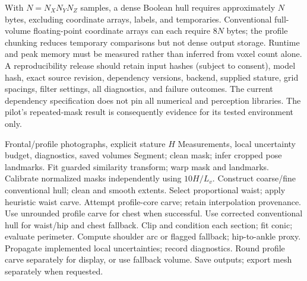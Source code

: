 \documentclass[11pt,a4paper]{article}
\numberwithin{equation}{section}
\begin{document}
With $N=N_XN_YN_Z$ samples, a dense Boolean hull requires approximately $N$ bytes, excluding coordinate arrays, labels, and temporaries. Conventional full-volume floating-point coordinate arrays can each require $8N$ bytes; the profile chunking reduces temporary comparisons but not dense output storage. Runtime and peak memory must be measured rather than inferred from voxel count alone. A reproducibility release should retain input hashes (subject to consent), model hash, exact source revision, dependency versions, backend, supplied stature, grid spacings, filter settings, all diagnostics, and failure outcomes. The current dependency specification does not pin all numerical and perception libraries. The pilot's repeated-mask result is consequently evidence for its tested environment only.

\begin{algorithm}[!t]
\caption{Implemented Two-Branch Anthropometry Pipeline}
\label{alg:implemented_pipeline}
\begin{algorithmic}[1]
\REQUIRE Frontal/profile photographs, explicit stature $H$
\ENSURE Measurements, local uncertainty budget, diagnostics, saved volumes
\STATE Segment; clean mask; infer cropped pose landmarks.
\STATE Fit guarded similarity transform; warp mask and landmarks.
\ENDFOR
\STATE Calibrate normalized masks independently using $10H/L_v$.
\STATE Construct coarse/fine conventional hull; clean and smooth extents.
\STATE Select proportional waist; apply heuristic waist carve.
\STATE Attempt profile-core carve; retain interpolation provenance.
\STATE Use unrounded profile carve for chest when successful.
\STATE Use corrected conventional hull for waist/hip and chest fallback.
\STATE Clip and condition each section; fit conic; evaluate perimeter.
\STATE Compute shoulder arc or flagged fallback; hip-to-ankle proxy.
\STATE Propagate implemented local uncertainties; record diagnostics.
\STATE Round profile carve separately for display, or use fallback volume.
\STATE Save outputs; export mesh separately when requested.
\end{algorithmic}
\end{algorithm}
\end{document}
